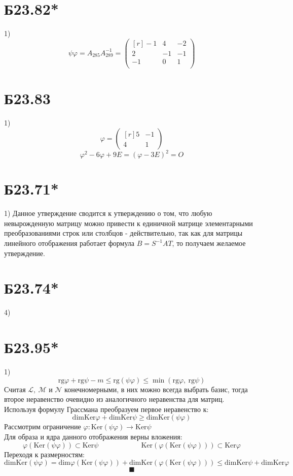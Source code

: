 \section*{Б23.82*}1) $$\psi\varphi=A_{285}A^{-1}_{289}=\begin{pmatrix*}[r]
    -1&4&-2\\
    2&-1&-1\\
    -1&0&1\\
\end{pmatrix*}$$
\section*{Б23.83}1)$$\varphi=\begin{pmatrix*}[r]
    5&-1\\
    4&1
\end{pmatrix*}$$
$$\varphi^2-6\varphi+9E=(\varphi-3E)^2=O$$
\section*{Б23.71*}1) Данное утверждение сводится к утверждению о том, что любую невырожденную матрицу можно привести к единичной матрице элементарными преобразованиями строк или столбцов - действительно, так как для матрицы линейного отображения работает формула $B=S^{-1}AT$, то получаем желаемое утверждение.
\section*{Б23.74*}4)
\section*{Б23.95*}1)$$\mathrm{rg}\varphi+\mathrm{rg}\psi-m\le\mathrm{rg}(\psi\varphi)\le\min(\mathrm{rg}\varphi,\ \mathrm{rg}\psi)$$
Считая $\mathcal{L},\ \mathcal{M}$ и $\mathcal{N}$ конечномерными, в них можно всегда выбрать базис, тогда второе неравенство очевидно из аналогичного неравенства для матриц.\\
Используя формулу Грассмана преобразуем первое неравенство к:
$$\mathrm{dim}\mathrm{Ker}\varphi+\mathrm{dim}\mathrm{Ker}\psi\ge\mathrm{dim}\mathrm{Ker}(\psi\varphi)$$
Рассмотрим ограничение $\varphi:\mathrm{Ker}(\psi\varphi)\to\mathrm{Ker}\psi$\\
Для образа и ядра данного отображения верны вложения:
$$\varphi\left(\mathrm{Ker}(\psi\varphi)\right)\subset\mathrm{Ker}\psi\qquad\qquad\qquad\mathrm{Ker}\left(\varphi\left(\mathrm{Ker}(\psi\varphi)\right)\right)\subset\mathrm{Ker}\varphi$$
Переходя к размерностям:
$$\mathrm{dim}\mathrm{Ker}(\psi\varphi)=\mathrm{dim}\varphi\left(\mathrm{Ker}(\psi\varphi)\right)+\mathrm{dim}\mathrm{Ker}\left(\varphi\left(\mathrm{Ker}(\psi\varphi)\right)\right)\le\mathrm{dim}\mathrm{Ker}\psi+\mathrm{dim}\mathrm{Ker}\varphi$$
$$\blacksquare$$
